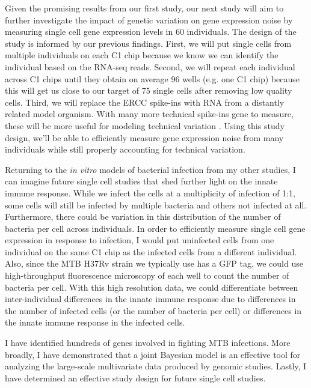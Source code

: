 Given the promising results from our first study, our next study will
aim to further investigate the impact of genetic variation on gene
expression noise by measuring single cell gene expression levels in 60
individuals. The design of the study is informed by our previous
findings. First, we will put single cells from multiple individuals on
each C1 chip because we know we can identify the individual based on
the RNA-seq reads. Second, we will repeat each individual across C1
chips until they obtain on average 96 wells (e.g. one C1 chip) because
this will get us close to our target of 75 single cells after removing
low quality cells. Third, we will replace the ERCC spike-ins with RNA
from a distantly related model organism. With many more technical
spike-ins gene to measure, these will be more useful for modeling
technical variation \citep{Risso2014}. Using this study design, we’ll
be able to efficiently measure gene expression noise from many
individuals while still properly accounting for technical variation.

Returning to the \emph{in vitro} models of bacterial infection from my
other studies, I can imagine future single cell studies that shed
further light on the innate immune response. While we infect the cells
at a multiplicity of infection of 1:1, some cells will still be
infected by multiple bacteria and others not infected at
all. Furthermore, there could be variation in this distribution of the
number of bacteria per cell across individuals. In order to
efficiently measure single cell gene expression in response to
infection, I would put uninfected cells from one individual on the
same C1 chip as the infected cells from a different individual. Also,
since the MTB H37Rv strain we typically use has a GFP tag, we could
use high-throughput fluorescence microscopy of each well to count the
number of bacteria per cell. With this high resolution data, we could
differentiate between inter-individual differences in the innate
immune response due to differences in the number of infected cells (or
the number of bacteria per cell) or differences in the innate immune
response in the infected cells.

I have identified hundreds of genes involved in fighting MTB
infections.  More broadly, I have demonstrated that a joint Bayesian
model is an effective tool for analyzing the large-scale multivariate
data produced by genomic studies. Lastly, I have determined an
effective study design for future single cell studies.
